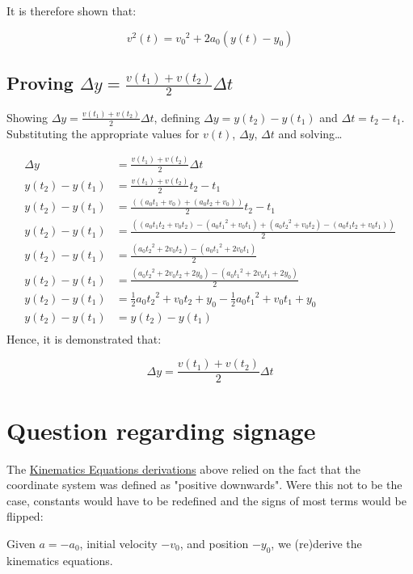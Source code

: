 \documentclass[letterpaper]{article}
\begin{document}
It is therefore shown that:

\begin{equation}
    v^2(t) = {v_0}^2 + 2a_0 (y(t) - y_0) 
\end{equation}

\subsection{Proving \(\Delta y = \frac{v(t_1)+v(t_2)}{2}\Delta t\)}
\label{sec:org4f0e467}
Showing \(\Delta y = \frac{v(t_1)+v(t_2)}{2}\Delta t\), defining \(\Delta y=y(t_2)-y(t_1)\) and \(\Delta t = t_2 - t_1\). Substituting the appropriate values for \(v(t)\), \(\Delta y\), \(\Delta t\) and solving\ldots{}

\begin{align}
    \Delta y &= \frac{v(t_1)+v(t_2)}{2}\Delta t \\
    y(t_2)-y(t_1) &= \frac{v(t_1)+v(t_2)}{2} t_2 - t_1 \\
    y(t_2)-y(t_1) &= \frac{((a_0t_1+v_0)+(a_0t_2+v_0))}{2} t_2 - t_1 \\
    y(t_2)-y(t_1) &= \frac{((a_0t_1t_2+v_0t_2)-(a_0{t_1}^2+v_0t_1)+(a_0{t_2}^2+v_0t_2)-(a_0t_1t_2+v_0t_1))}{2} \\
    y(t_2)-y(t_1) &= \frac{(a_0{t_2}^2+2v_0t_2)-(a_0{t_1}^2+2v_0t_1)}{2} \\
    y(t_2)-y(t_1) &= \frac{(a_0{t_2}^2+2v_0t_2+2y_0)-(a_0{t_1}^2+2v_0t_1+2y_0)}{2} \\
    y(t_2)-y(t_1) &= \frac{1}{2} a_0{t_2}^2+v_0t_2+y_0 - \frac{1}{2} a_0{t_1}^2+v_0t_1+y_0 \\
    y(t_2)-y(t_1) &= y(t_2) - y(t_1) \\
\end{align}
Hence, it is demonstrated that: 

\begin{equation}
    \Delta y = \frac{v(t_1)+v(t_2)}{2}\Delta t
\end{equation}

\section{Question regarding signage}
\label{sec:org1d3a5b3}
The \hyperref[sec:org085a976]{Kinematics Equations derivations} above relied on the fact that the coordinate system was defined as "positive downwards". Were this not to be the case, constants would have to be redefined and the signs of most terms would be flipped:

Given \(a=-a_0\), initial velocity \(-v_0\), and position \(-y_0\), we (re)derive the kinematics equations.
\end{document}
